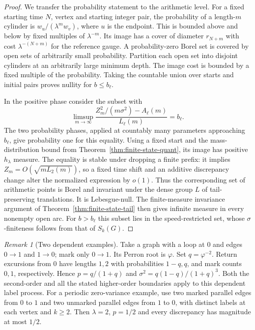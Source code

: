 \documentclass[11pt]{article}
\theoremstyle{definition}
\theoremstyle{remark}
\newtheorem{remark}[theorem]{Remark}
\begin{document}
\begin{proof}
We transfer the probability statement to the arithmetic level.
For a fixed starting time $N$, vertex and starting integer pair,
the probability of a length-$m$ cylinder is
$w_u/(\lambda^m w_v)$, where $u$ is the endpoint.
This is bounded above and below by fixed multiples of
$\lambda^{-m}$. Its image has a cover of diameter $r_{N+m}$
with cost $\lambda^{-(N+m)}$ for the reference gauge.
A probability-zero Borel set is covered by open sets of arbitrarily
small probability. Partition each open set into disjoint cylinders
at an arbitrarily large minimum depth. The image cost is bounded
by a fixed multiple of the probability. Taking the countable union
over starts and initial pairs proves nullity for $b\le b_\ell$.

In the positive phase consider the subset with
\[
 \limsup_{m\to\infty}
 \frac{Z_m^2/(m\sigma^2)-A_\ell(m)}{L_\ell(m)}=b_\ell .
\]
The two probability phases, applied at countably many parameters
approaching $b_\ell$, give probability one for this equality.
Using a fixed start and the mass-distribution bound from
Theorem~\ref{thm:finite-state-quant}, its image has positive
$h_\lambda$ measure. The equality is stable under dropping a
finite prefix: it implies $Z_m=O(\sqrt{mL_2(m)})$, so a fixed
time shift and an additive discrepancy change alter the
normalized expression by $o(1)$. Thus the corresponding set
of arithmetic points is Borel and invariant under the dense group
$L$ of tail-preserving translations. It is Lebesgue-null.
The finite-measure invariance argument of
Theorem~\ref{thm:finite-state-tail} then gives infinite measure
in every nonempty open arc. For $b>b_\ell$ this subset lies in
the speed-restricted set, whose $\sigma$-finiteness follows
from that of $S_k(G)$.
\end{proof}

\begin{remark}[Two dependent examples]
Take a graph with a loop at $0$ and edges $0\to1$ and $1\to0$;
mark only $0\to1$. Its Perron root is $\varphi$.
Set $q=\varphi^{-2}$. Return excursions from $0$ have
lengths $1,2$ with probabilities $1-q,q$, and mark counts
$0,1$, respectively. Hence
$p=q/(1+q)$ and $\sigma^2=q(1-q)/(1+q)^3$.
Both the second-order and all the stated higher-order
boundaries apply to this dependent label process.
For a periodic zero-variance example, use two marked parallel
edges from $0$ to $1$ and two unmarked parallel edges from $1$
to $0$, with distinct labels at each vertex and $k\ge2$.
Then $\lambda=2$, $p=1/2$ and every discrepancy
has magnitude at most $1/2$.
\end{remark}
\end{document}
